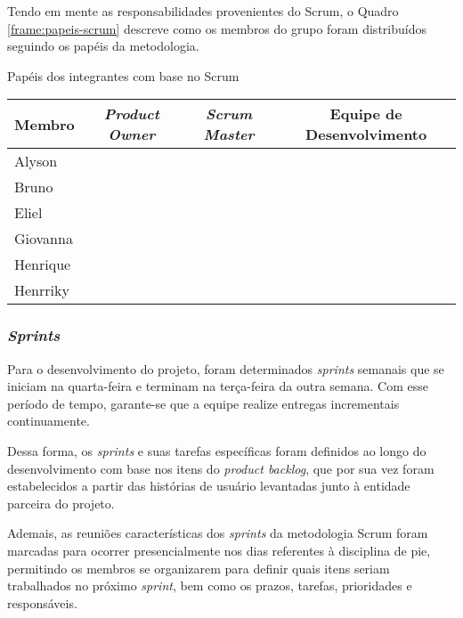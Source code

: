 Tendo em mente as responsabilidades provenientes do Scrum, o Quadro \ref{frame:papeis-scrum} descreve como os membros do grupo foram distribuídos seguindo os papéis da metodologia.

\begin{quadro}[ht]
	\setlength{\tabcolsep}{3pt}
	\begin{center}
		\caption{\label{frame:papeis-scrum}Papéis dos integrantes com base no Scrum}
		\begin{tabular}{|l|c|c|c|}
			\hline
			\textbf{Membro} & \textbf{\textit{Product Owner}} & \textbf{\textit{Scrum Master}} & \textbf{Equipe de Desenvolvimento} \\
			\hline
			Alyson &  & \checkmark & \checkmark \\
			\hline
			Bruno &  &  & \checkmark \\
			\hline
			Eliel &  &  & \checkmark \\
			\hline
			Giovanna &  &  & \checkmark \\
			\hline
			Henrique &  &  & \checkmark \\
			\hline
			Henrriky & \checkmark &  & \checkmark \\
			\hline
		\end{tabular}
	\end{center}
\end{quadro}

\subsubsection{\emph{Sprints}}

Para o desenvolvimento do projeto, foram determinados \textit{sprints} semanais que se iniciam na quarta-feira e terminam na terça-feira da outra semana. Com esse período de tempo, garante-se que a equipe realize entregas incrementais continuamente.

Dessa forma, os \textit{sprints} e suas tarefas específicas foram definidos ao longo do desenvolvimento com base nos itens do \textit{product backlog}, que por sua vez foram estabelecidos a partir das histórias de usuário levantadas junto à entidade parceira do projeto.

Ademais, as reuniões características dos \textit{sprints} da metodologia Scrum foram marcadas para ocorrer presencialmente nos dias referentes à disciplina de \gls{pie}, permitindo os membros se organizarem para definir quais itens seriam trabalhados no próximo \textit{sprint}, bem como os prazos, tarefas, prioridades e responsáveis. 
